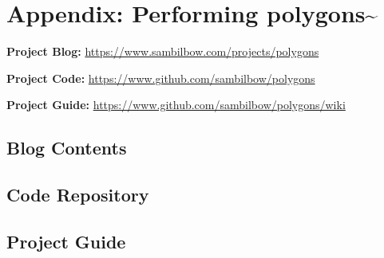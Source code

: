 \chapter{Appendix: Performing polygons\textasciitilde{}}

\noindent \textbf{Project Blog:}        \url{https://www.sambilbow.com/projects/polygons}

\noindent \textbf{Project Code:}        \url{https://www.github.com/sambilbow/polygons}

\noindent \textbf{Project Guide:}       \url{https://www.github.com/sambilbow/polygons/wiki}


\section{Blog Contents}
\section{Code Repository}
\section{Project Guide}